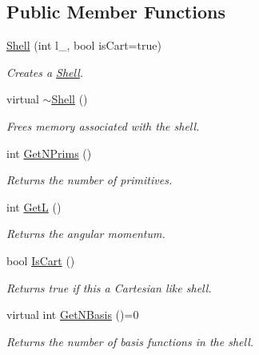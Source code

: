 \subsection*{Public Member Functions}
\begin{DoxyCompactItemize}
\item 
\hyperlink{classJKBuilder_1_1Shell_aaf2d048844f6fbd887a4d915fd25e711}{Shell} (int l\_, bool isCart=true)
\begin{DoxyCompactList}\small\item\em Creates a \hyperlink{classJKBuilder_1_1Shell}{Shell}. \item\end{DoxyCompactList}\item 
virtual \hyperlink{classJKBuilder_1_1Shell_aafdad0fa9de137c286b786898f3ba361}{$\sim$Shell} ()
\begin{DoxyCompactList}\small\item\em Frees memory associated with the shell. \item\end{DoxyCompactList}\item 
int \hyperlink{classJKBuilder_1_1Shell_abc886cd4e35d3c56a0250b7d06986f61}{GetNPrims} ()
\begin{DoxyCompactList}\small\item\em Returns the number of primitives. \item\end{DoxyCompactList}\item 
int \hyperlink{classJKBuilder_1_1Shell_a7cc8fc5bc043267a7b47e69503e0e308}{GetL} ()
\begin{DoxyCompactList}\small\item\em Returns the angular momentum. \item\end{DoxyCompactList}\item 
bool \hyperlink{classJKBuilder_1_1Shell_a75c22d97e837f5c439eb51aa223bed98}{IsCart} ()
\begin{DoxyCompactList}\small\item\em Returns true if this a Cartesian like shell. \item\end{DoxyCompactList}\item 
virtual int \hyperlink{classJKBuilder_1_1Shell_a1167cdb6f1e1ba08ba6cbffa0b32ca77}{GetNBasis} ()=0
\begin{DoxyCompactList}\small\item\em Returns the number of basis functions in the shell. \item\end{DoxyCompactList}\item 

\end{DoxyCompactItemize}
